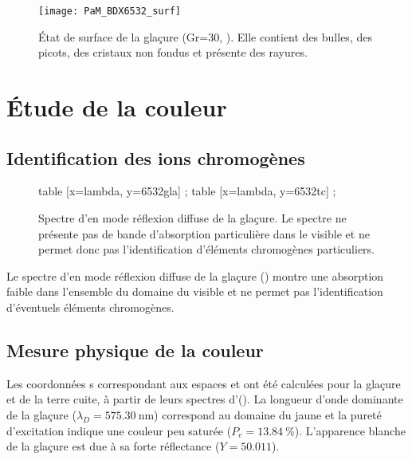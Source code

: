 \begin{figure}[htb]
  \texttt{[image: PaM\_BDX6532\_surf]}
  \caption{\legendeE 
           État de surface de la glaçure (Gr=30, ). Elle contient des bulles, des 
           picots, des cristaux non fondus et présente des rayures.}
  \label{surf:6532}
\end{figure}


\section{Étude de la couleur}

\subsection{Identification des ions chromogènes}
\begin{figure}[htb]
  \begin{plotspectre}
       table [x=lambda, y=6532gla] {\gladata} ;
       table [x=lambda, y=6532tc] {\tcdata} ;
  \end{plotspectre}
  \caption{\legendeE 
           Spectre d'\AO en mode réflexion diffuse de la glaçure. Le spectre ne présente pas de bande d'absorption particulière dans le visible et ne permet donc pas l'identification d'éléments chromogènes particuliers.}
  \label{spectre:6532}
\end{figure}

Le spectre d'\AO en mode réflexion diffuse de la glaçure () montre une absorption faible dans l'ensemble du domaine du visible et ne permet pas l'identification d'éventuels éléments chromogènes.

\subsection{Mesure physique de la couleur}
Les coordonnées \trichro s correspondant aux espaces \Yxy et \Lab ont été calculées pour la glaçure et de la terre cuite, à partir de leurs spectres d'\AO (). La longueur d'onde dominante de la glaçure ($\lambda_D=\SI{575.30}{\nm}$) correspond au domaine du jaune \autocite{Kelly_1976} et la pureté d'excitation indique une couleur peu saturée ($P_e=\SI{13.84}{\percent}$). L'apparence blanche de la glaçure est due à sa forte réflectance ($Y=\num{50.011}$).


